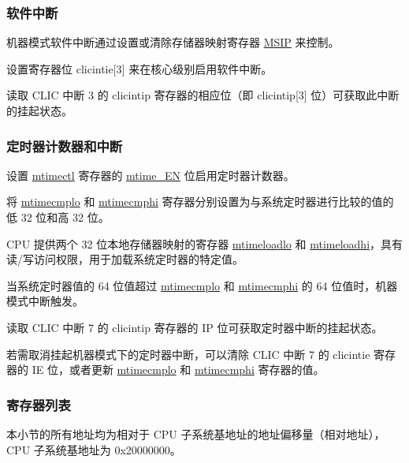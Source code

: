 \documentclass[main\_\_CN.tex]{subfiles}
\begin{document}
\subsubsection{软件中断}
\label{sec:riscvcpu-clint-software}

机器模式软件中断通过设置或清除存储器映射寄存器 \hyperref[regdesc:CLINTMSIPREG]{MSIP} 来控制。

设置寄存器位 clicintie[3] 来在核心级别启用软件中断。

读取 CLIC 中断 3 的 clicintip 寄存器的相应位（即 clicintip[3] 位）可获取此中断的挂起状态。


\subsubsection{定时器计数器和中断}
\label{sec:riscvcpu-clint-timer}

设置 \hyperref[regdesc:CLINTMTIMECTLREG]{mtimectl} 寄存器的 \hyperref[fielddesc:CLINTMTIMECTLEN]{mtime\_EN} 位启用定时器计数器。

将 \hyperref[regdesc:CLINTMTIMECMPLOREG]{mtimecmplo} 和 \hyperref[regdesc:CLINTMTIMECMPHIREG]{mtimecmphi} 寄存器分别设置为与系统定时器进行比较的值的低 32 位和高 32 位。

CPU 提供两个 32 位本地存储器映射的寄存器 \hyperref[regdesc:CLINTMTIMELOADLOREG]{mtimeloadlo} 和 \hyperref[regdesc:CLINTMTIMELOADHIREG]{mtimeloadhi}，具有读/写访问权限，用于加载系统定时器的特定值。

当系统定时器值的 64 位值超过 \hyperref[regdesc:CLINTMTIMECMPLOREG]{mtimecmplo} 和 \hyperref[regdesc:CLINTMTIMECMPHIREG]{mtimecmphi} 的 64 位值时，机器模式中断触发。

读取 CLIC 中断 7 的 clicintip 寄存器的 IP 位可获取定时器中断的挂起状态。

若需取消挂起机器模式下的定时器中断，可以清除 CLIC 中断 7 的 clicintie 寄存器的 IE 位，或者更新 \hyperref[regdesc:CLINTMTIMECMPLOREG]{mtimecmplo} 和 \hyperref[regdesc:CLINTMTIMECMPHIREG]{mtimecmphi} 寄存器的值。


\hypertarget{riscvcpu-clint-reg-summ}{}
\subsubsection{寄存器列表}
\label{sec:riscvcpu-clint-reg-summ}

本小节的所有地址均为相对于 CPU 子系统基地址的地址偏移量（相对地址），CPU 子系统基地址为 0x20000000。
\end{document}
